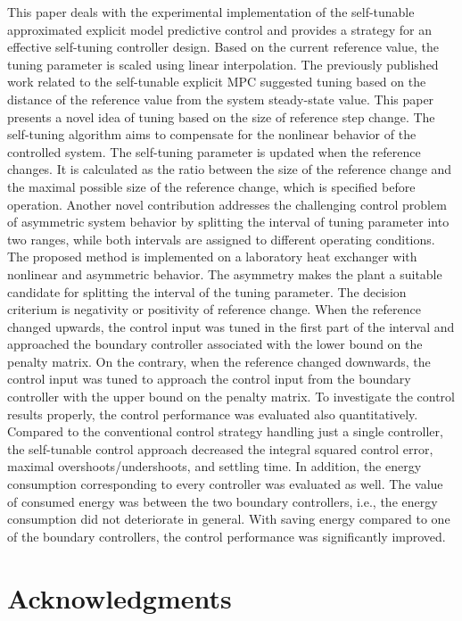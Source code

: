 \documentclass[preprint,12pt]{elsarticle}
\begin{document}
	This paper deals with the experimental implementation of the self-tunable approximated explicit model predictive control and provides a strategy for an effective self-tuning controller design. Based on the current reference value, the tuning parameter is scaled using linear interpolation. The previously published work related to the self-tunable explicit MPC suggested tuning based on the distance of the reference value from the system steady-state value. This paper presents a novel idea of tuning based on the size of reference step change. The self-tuning algorithm aims to compensate for the nonlinear behavior of the controlled system. The self-tuning parameter is updated when the reference changes. It is calculated as the ratio between the size of the reference change and the maximal possible size of the reference change, which is specified before operation. 
	Another novel contribution addresses the challenging control problem of asymmetric system behavior by splitting the interval of tuning parameter into two ranges, while both intervals are assigned to different operating conditions. The proposed method is implemented on a laboratory heat exchanger with nonlinear and asymmetric behavior. The asymmetry makes the plant a suitable candidate for splitting the interval of the tuning parameter. The decision criterium is negativity or positivity of reference change. When the reference changed upwards, the control input was tuned in the first part of the interval and approached the boundary controller associated with the lower bound on the penalty matrix. On the contrary, when the reference changed downwards, the control input was tuned to approach the control input from the boundary controller with the upper bound on the penalty matrix. To investigate the control results properly, the control performance was evaluated also quantitatively. Compared to the conventional control strategy handling just a single controller, the self-tunable control approach decreased the integral squared control error, maximal overshoots/undershoots, and settling time. In addition, the energy consumption corresponding to every controller was evaluated as well. The value of consumed energy was between the two boundary controllers, i.e., the energy consumption did not deteriorate in general. With saving energy compared to one of the boundary controllers, the control performance was significantly improved. 
	
	\section*{Acknowledgments}
	
\end{document}

